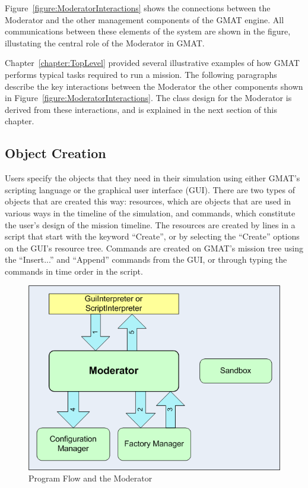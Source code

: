 Figure~\ref{figure:ModeratorInteractions} shows the connections between the Moderator and the other
management components of the GMAT engine.  All communications between these elements of the system
are shown in the figure, illustating the central role of the Moderator in GMAT.

Chapter~\ref{chapter:TopLevel} provided several illustrative examples of how GMAT performs typical
tasks required to run a mission.  The following paragraphs describe the key interactions between the
Moderator the other components shown in Figure~\ref{figure:ModeratorInteractions}.  The class
design for the Moderator is derived from these interactions, and is explained in the next section
of this chapter.

\subsection{Object Creation}

Users specify the objects that they need in their simulation using either GMAT's scripting language
or the graphical user interface (GUI).  There are two types of objects that are created this way:
resources, which are objects that are used in various ways in the timeline of the simulation, and
commands, which constitute the user's design of the mission timeline.  The resources are created by
lines in a script that start with the keyword ``Create'', or by selecting the ``Create'' options on
the GUI's resource tree.  Commands are created on GMAT's mission tree using the ``Insert...'' and
``Append'' commands from the GUI, or through typing the commands in time order in the script.

\begin{figure}[htb]
\begin{center}
\includegraphics[239,175]{Images/ModeratorCreate.png}
\caption{Program Flow and the Moderator}
\label{figure:ModeratorCreate}
\end{center}
\end{figure}

